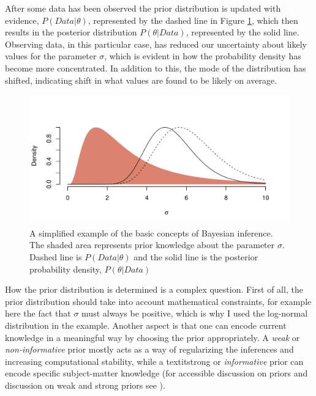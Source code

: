 \documentclass{article}\usepackage{knitr}
\begin{document}
After some data has been observed the prior distribution is updated with evidence, $P(Data | \theta)$, represented by the dashed line in Figure \ref{fig:priorpost}, which then results in the posterior distribution $P(\theta | Data)$, represented by the solid line. Observing data, in this particular case, has reduced our uncertainty about likely values for the parameter $\sigma$, which is evident in how the probability density has become more concentrated. In addition to this, the mode of the distribution has shifted, indicating shift in what values are found to be likely on average.

\begin{figure}
\centering
\begin{knitrout}
\color{fgcolor}
\includegraphics[width=\maxwidth]{figure/unnamed-chunk-12-1} 

\end{knitrout}
\caption{A simplified example of the basic concepts of Bayesian inference. The shaded area represents prior knowledge about the parameter $\sigma$. Dashed line is $P(Data | \theta)$ and the solid line is the posterior probability density, $P(\theta | Data)$}
\label{fig:priorpost}
\end{figure}

How the prior distribution is determined is a complex question. First of all, the prior distribution should take into account mathematical constraints, for example here the fact that $\sigma$ must always be positive, which is why I used the log-normal distribution in the example. Another aspect is that one can encode current knowledge in a meaningful way by choosing the prior appropriately. A \textit{weak} or \textit{non-informative} prior mostly acts as a way of regularizing the inferences and increasing computational stability, while a textit{strong} or \textit{informative} prior can encode specific subject-matter knowledge (for accessible discussion on priors and discussion on weak and strong priors see \citet{prior_choice_recommendations}). 
\end{document}

